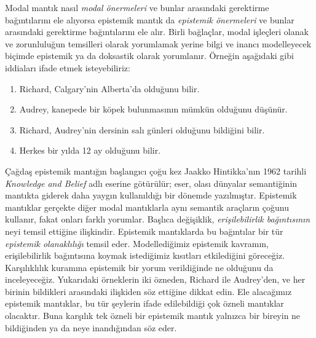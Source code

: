 \documentclass[../../../include/open-logic-section]{subfiles}
\begin{document}


Modal mantık nasıl \emph{modal önermeleri} ve bunlar arasındaki gerektirme
bağıntılarını ele alıyorsa epistemik mantık da \emph{epistemik önermeleri} ve
bunlar arasındaki gerektirme bağıntılarını ele alır. Birli bağlaçlar, modal
işleçleri olanak ve zorunluluğun temsilleri olarak yorumlamak yerine bilgi ve
inancı modelleyecek biçimde epistemik ya da doksastik olarak yorumlanır.
Örneğin aşağıdaki gibi iddiaları ifade etmek isteyebiliriz:

\begin{enumerate}
\item Richard, Calgary'nin Alberta'da olduğunu bilir.
\item Audrey, kanepede bir köpek bulunmasının mümkün olduğunu düşünür.
\item Richard, Audrey'nin dersinin salı günleri olduğunu bildiğini bilir.
\item Herkes bir yılda 12 ay olduğunu bilir.
\end{enumerate}
Çağdaş epistemik mantığın başlangıcı çoğu kez Jaakko Hintikka'nın 1962 tarihli
\emph{Knowledge and Belief} adlı eserine götürülür; eser, olası dünyalar
semantiğinin mantıkta giderek daha yaygın kullanıldığı bir dönemde yazılmıştır.
Epistemik mantıklar gerçekte diğer modal mantıklarla aynı semantik araçların
çoğunu kullanır, fakat onları farklı yorumlar. Başlıca değişiklik,
\emph{erişilebilirlik bağıntısının} neyi temsil ettiğine ilişkindir. Epistemik
mantıklarda bu bağıntılar bir tür \emph{epistemik olanaklılığı} temsil eder.
Modellediğimiz epistemik kavramın, erişilebilirlik bağıntısına koymak
istediğimiz kısıtları etkilediğini göreceğiz. Karşılıklılık kuramına epistemik
bir yorum verildiğinde ne olduğunu da inceleyeceğiz. Yukarıdaki örneklerin iki
özneden, Richard ile Audrey'den, ve her birinin bildikleri arasındaki ilişkiden
söz ettiğine dikkat edin. Ele alacağımız epistemik mantıklar, bu tür şeylerin
ifade edilebildiği çok özneli mantıklar olacaktır. Buna karşılık tek özneli bir
epistemik mantık yalnızca bir bireyin ne bildiğinden ya da neye inandığından
söz eder.
\end{document}
